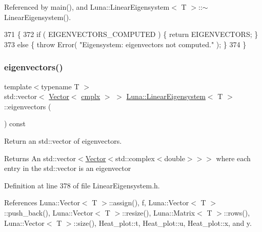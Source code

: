 Referenced by main(), and Luna\+::\+Linear\+Eigensystem$<$ T $>$\+::$\sim$\+Linear\+Eigensystem().


\begin{DoxyCode}
371   \{
372     \textcolor{keywordflow}{if} ( EIGENVECTORS\_COMPUTED ) \{ \textcolor{keywordflow}{return} EIGENVECTORS; \}
373     \textcolor{keywordflow}{else} \{ \textcolor{keywordflow}{throw} Error( \textcolor{stringliteral}{"Eigensystem: eigenvectors not computed."} ); \}
374   \}
\end{DoxyCode}
\mbox{\label{classLuna_1_1LinearEigensystem_a34fd0e8eef6dc0e85a13d1cb78beb32f}} 
\subsubsection{\texorpdfstring{eigenvectors()}{eigenvectors()}}
{\footnotesize\ttfamily template$<$typename T $>$ \\
std\+::vector$<$ \hyperlink{classLuna_1_1Vector}{Vector}$<$ \hyperlink{namespaceLuna_af3257e90072a78a8ffb16a16773aa18e}{cmplx} $>$ $>$ \hyperlink{classLuna_1_1LinearEigensystem}{Luna\+::\+Linear\+Eigensystem}$<$ T $>$\+::eigenvectors (\begin{DoxyParamCaption}{ }\end{DoxyParamCaption}) const\hspace{0.3cm}{\ttfamily [inline]}}



Return an std\+::vector of eigenvectors. 

\begin{DoxyReturn}{Returns}
An std\+::vector$<$\hyperlink{classLuna_1_1Vector}{Vector}$<$std\+::complex$<$double$>$$>$$>$ where each entry in the std\+::vector is an eigenvector 
\end{DoxyReturn}


Definition at line 378 of file Linear\+Eigensystem.\+h.



References Luna\+::\+Vector$<$ T $>$\+::assign(), f, Luna\+::\+Vector$<$ T $>$\+::push\+\_\+back(), Luna\+::\+Vector$<$ T $>$\+::resize(), Luna\+::\+Matrix$<$ T $>$\+::rows(), Luna\+::\+Vector$<$ T $>$\+::size(), Heat\+\_\+plot\+::t, Heat\+\_\+plot\+::u, Heat\+\_\+plot\+::x, and y.



